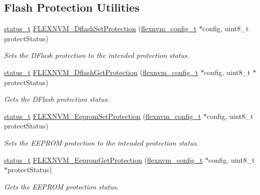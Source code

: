 \subsection*{Flash Protection Utilities}
\begin{DoxyCompactItemize}
\item 
\mbox{\hyperlink{group__ksdk__common_gaaabdaf7ee58ca7269bd4bf24efcde092}{status\+\_\+t}} \mbox{\hyperlink{group__ftfx__flexnvm__driver_ga320d0c4cb3cdbfe304402c40e14ad036}{F\+L\+E\+X\+N\+V\+M\+\_\+\+Dflash\+Set\+Protection}} (\mbox{\hyperlink{group__ftfx__flexnvm__driver_ga8fd4d473c0a4b30cac163160fb28a6c1}{flexnvm\+\_\+config\+\_\+t}} $\ast$config, uint8\+\_\+t protect\+Status)
\begin{DoxyCompactList}\small\item\em Sets the D\+Flash protection to the intended protection status. \end{DoxyCompactList}\item 
\mbox{\hyperlink{group__ksdk__common_gaaabdaf7ee58ca7269bd4bf24efcde092}{status\+\_\+t}} \mbox{\hyperlink{group__ftfx__flexnvm__driver_gafcfdce5609c9cabe30bff2c586566f89}{F\+L\+E\+X\+N\+V\+M\+\_\+\+Dflash\+Get\+Protection}} (\mbox{\hyperlink{group__ftfx__flexnvm__driver_ga8fd4d473c0a4b30cac163160fb28a6c1}{flexnvm\+\_\+config\+\_\+t}} $\ast$config, uint8\+\_\+t $\ast$protect\+Status)
\begin{DoxyCompactList}\small\item\em Gets the D\+Flash protection status. \end{DoxyCompactList}\item 
\mbox{\hyperlink{group__ksdk__common_gaaabdaf7ee58ca7269bd4bf24efcde092}{status\+\_\+t}} \mbox{\hyperlink{group__ftfx__flexnvm__driver_ga6544827e158a04c7cd20c6dbab9588b2}{F\+L\+E\+X\+N\+V\+M\+\_\+\+Eeprom\+Set\+Protection}} (\mbox{\hyperlink{group__ftfx__flexnvm__driver_ga8fd4d473c0a4b30cac163160fb28a6c1}{flexnvm\+\_\+config\+\_\+t}} $\ast$config, uint8\+\_\+t protect\+Status)
\begin{DoxyCompactList}\small\item\em Sets the E\+E\+P\+R\+OM protection to the intended protection status. \end{DoxyCompactList}\item 
\mbox{\hyperlink{group__ksdk__common_gaaabdaf7ee58ca7269bd4bf24efcde092}{status\+\_\+t}} \mbox{\hyperlink{group__ftfx__flexnvm__driver_gaf0b39c76fa3dc2b137e269a1f1d5a9e8}{F\+L\+E\+X\+N\+V\+M\+\_\+\+Eeprom\+Get\+Protection}} (\mbox{\hyperlink{group__ftfx__flexnvm__driver_ga8fd4d473c0a4b30cac163160fb28a6c1}{flexnvm\+\_\+config\+\_\+t}} $\ast$config, uint8\+\_\+t $\ast$protect\+Status)
\begin{DoxyCompactList}\small\item\em Gets the E\+E\+P\+R\+OM protection status. \end{DoxyCompactList}\end{DoxyCompactItemize}
